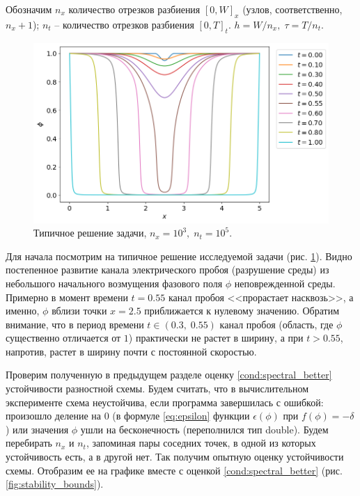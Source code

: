 Обозначим $n_x$ количество отрезков разбиения $[0, W]_x$ (узлов, соответственно, $n_x + 1$); $n_t$ -- количество отрезков разбиения $[0, T]_t$. $h = W / n_x, \; \tau = T / n_t$.

\begin{figure}[!tp]
    \centering
    \includegraphics[width=\textwidth]{figures/typical_solution.png}
    \vspace{-0.8cm}
    \caption{Типичное решение задачи, $n_x = 10^3, \; n_t = 10^5$.}
    \label{fig:typical_solution}
\end{figure}

Для начала посмотрим на типичное решение исследуемой задачи (рис. \ref{fig:typical_solution}). Видно постепенное развитие канала электрического пробоя (разрушение среды) из небольшого начального возмущения фазового поля $\phi$ неповрежденной среды. Примерно в момент времени $t = 0.55$ канал пробоя <<прорастает насквозь>>, а именно, $\phi$ вблизи точки $x = 2.5$ приближается к нулевому значению. Обратим внимание, что в период времени $t \in (0.3, \; 0.55)$ канал пробоя (область, где $\phi$ существенно отличается от $1$) практически не растет в ширину, а при $t > 0.55$, напротив, растет в ширину почти с постоянной скоростью.

Проверим полученную в предыдущем разделе оценку \eqref{cond:spectral_better} устойчивости разностной схемы. Будем считать, что в вычислительном эксперименте схема неустойчива, если программа завершилась с ошибкой: произошло деление на $0$ (в формуле \eqref{eq:epsilon} функции $\epsilon(\phi)$ при $f(\phi) = -\delta$) или значения $\phi$ ушли на бесконечность (переполнился тип double). Будем перебирать $n_x$ и $n_t$, запоминая пары соседних точек, в одной из которых устойчивость есть, а в другой нет. Так получим опытную оценку устойчивости схемы. Отобразим ее на графике вместе с оценкой \eqref{cond:spectral_better} (рис. \ref{fig:stability_bounds}).

